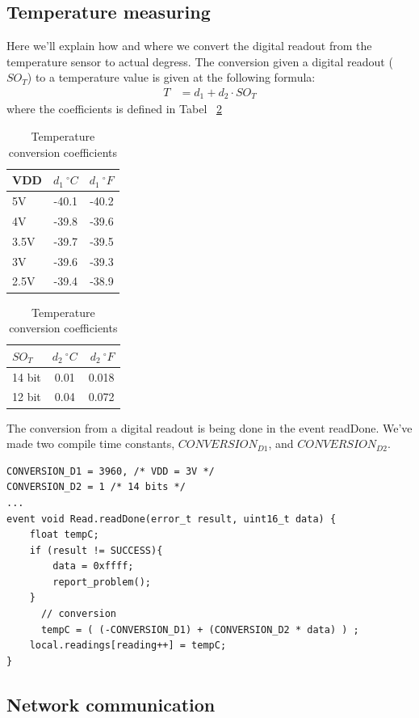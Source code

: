 \documentclass[a4paper,11pt,titlepage]{article}
\begin{document}
\subsection{Temperature measuring}
Here we'll explain how and where we convert the digital readout from the temperature sensor to actual degress.
The conversion given a digital readout ($SO_{T}$) to a temperature value is given at the following formula\cite{temperature}:
\begin{align*}
	T &= d_{1} + d_{2} \cdot SO_{T}
\end{align*}
where the coefficients is defined in Tabel ~\ref{table:temperature}
\begin{table}[ht]
\centering
\begin{tabular}{ | l | c | r | }
	\hline
	VDD & $d_{1} \ ^{\circ}  C$ & $d_{1} \ ^{\circ}  F$ \\
	\hline \hline
	5V & -40.1 & -40.2 \\
	\hline
	4V & -39.8 & -39.6 \\
	\hline
	3.5V & -39.7 & -39.5 \\
	\hline
	3V & -39.6 & -39.3 \\
	\hline
	2.5V & -39.4 & -38.9 \\
	\hline
\end{tabular}
\begin{tabular}{ | l | c | r | }
	\hline
	$SO_{T}$ & $d_{2}  \ ^{\circ}C$ & $d_{2} \ ^{\circ} F$ \\
	\hline \hline
	14 bit & 0.01 & 0.018 \\
	\hline
	12 bit & 0.04 & 0.072\\
	\hline
\end{tabular}
\caption{Temperature conversion coefficients}
\label{table:temperature}
\end{table}
The conversion from a digital readout is being done in the event readDone. We've made two compile time constants, $CONVERSION_{D1}$, and $CONVERSION_{D2}$.
\begin{lstlisting}
CONVERSION_D1 = 3960, /* VDD = 3V */
CONVERSION_D2 = 1 /* 14 bits */
...
event void Read.readDone(error_t result, uint16_t data) {
	float tempC;
	if (result != SUCCESS){
		data = 0xffff;
		report_problem();
	}
	  // conversion
	  tempC = ( (-CONVERSION_D1) + (CONVERSION_D2 * data) ) ;
    local.readings[reading++] = tempC;
}
\end{lstlisting}


\subsection{Network communication}
\end{document}
